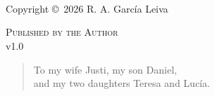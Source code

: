 \documentclass[11pt,fleqn]{book} %
\begin{document}


~\vfill
\thispagestyle{empty}
\newpage

~\vfill
\thispagestyle{empty}
\newpage


\newpage
~\vfill
\thispagestyle{empty}

\noindent Copyright \copyright\ 2026 R. A. García Leiva %

\noindent \textsc{Published by the Author}\\ %

\noindent v1.0



\newpage\null\thispagestyle{empty}\newpage

\newpage
\thispagestyle{empty}

\begin{quote}
\begin{flushright}
To my wife Justi, my son Daniel, \\
and my two daughters Teresa and Lucía.
\end{flushright}
\end{quote}




\pagestyle{empty} %

\tableofcontents %



\cleardoublepage %
\end{document}
